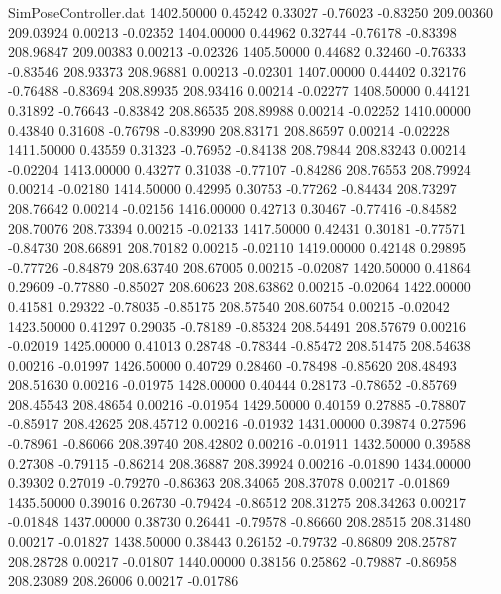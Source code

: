 \begin{filecontents}{SimPoseController.dat}
1402.50000    0.45242    0.33027    -0.76023   -0.83250  209.00360  209.03924    0.00213   -0.02352
1404.00000    0.44962    0.32744    -0.76178   -0.83398  208.96847  209.00383    0.00213   -0.02326
1405.50000    0.44682    0.32460    -0.76333   -0.83546  208.93373  208.96881    0.00213   -0.02301
1407.00000    0.44402    0.32176    -0.76488   -0.83694  208.89935  208.93416    0.00214   -0.02277
1408.50000    0.44121    0.31892    -0.76643   -0.83842  208.86535  208.89988    0.00214   -0.02252
1410.00000    0.43840    0.31608    -0.76798   -0.83990  208.83171  208.86597    0.00214   -0.02228
1411.50000    0.43559    0.31323    -0.76952   -0.84138  208.79844  208.83243    0.00214   -0.02204
1413.00000    0.43277    0.31038    -0.77107   -0.84286  208.76553  208.79924    0.00214   -0.02180
1414.50000    0.42995    0.30753    -0.77262   -0.84434  208.73297  208.76642    0.00214   -0.02156
1416.00000    0.42713    0.30467    -0.77416   -0.84582  208.70076  208.73394    0.00215   -0.02133
1417.50000    0.42431    0.30181    -0.77571   -0.84730  208.66891  208.70182    0.00215   -0.02110
1419.00000    0.42148    0.29895    -0.77726   -0.84879  208.63740  208.67005    0.00215   -0.02087
1420.50000    0.41864    0.29609    -0.77880   -0.85027  208.60623  208.63862    0.00215   -0.02064
1422.00000    0.41581    0.29322    -0.78035   -0.85175  208.57540  208.60754    0.00215   -0.02042
1423.50000    0.41297    0.29035    -0.78189   -0.85324  208.54491  208.57679    0.00216   -0.02019
1425.00000    0.41013    0.28748    -0.78344   -0.85472  208.51475  208.54638    0.00216   -0.01997
1426.50000    0.40729    0.28460    -0.78498   -0.85620  208.48493  208.51630    0.00216   -0.01975
1428.00000    0.40444    0.28173    -0.78652   -0.85769  208.45543  208.48654    0.00216   -0.01954
1429.50000    0.40159    0.27885    -0.78807   -0.85917  208.42625  208.45712    0.00216   -0.01932
1431.00000    0.39874    0.27596    -0.78961   -0.86066  208.39740  208.42802    0.00216   -0.01911
1432.50000    0.39588    0.27308    -0.79115   -0.86214  208.36887  208.39924    0.00216   -0.01890
1434.00000    0.39302    0.27019    -0.79270   -0.86363  208.34065  208.37078    0.00217   -0.01869
1435.50000    0.39016    0.26730    -0.79424   -0.86512  208.31275  208.34263    0.00217   -0.01848
1437.00000    0.38730    0.26441    -0.79578   -0.86660  208.28515  208.31480    0.00217   -0.01827
1438.50000    0.38443    0.26152    -0.79732   -0.86809  208.25787  208.28728    0.00217   -0.01807
1440.00000    0.38156    0.25862    -0.79887   -0.86958  208.23089  208.26006    0.00217   -0.01786

\end{filecontents}
